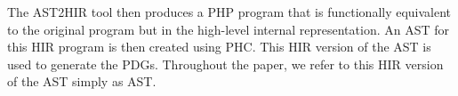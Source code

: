 The AST2HIR tool then produces a PHP program that is functionally 
equivalent to the original program but in the high-level internal 
representation. An AST for this HIR program is then created using 
PHC. This HIR version of the AST is used to generate the PDGs. 
Throughout the paper, we refer to this HIR version of the AST
simply as AST.

